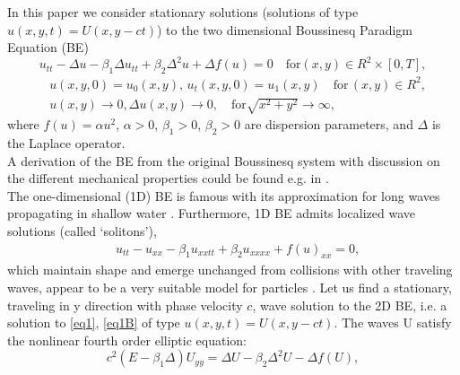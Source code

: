 \documentclass[12pt]{article}
\theoremstyle{theorem}
\theoremstyle{defi}
\begin{document}
In this paper we consider stationary solutions (solutions of type  $u(x,y,t)=U(x,y - ct)$) to the two dimensional Boussinesq Paradigm Equation (BE) 
\begin{equation}
u_{tt} - \Delta u -\beta_1  \Delta u_{tt} +\beta_2 \Delta ^2 u + \Delta f(u)=0 \quad \text{for} (x,y) \in R^2 \times [0,T] ,\label{eq1}
\end{equation}
\begin{equation}\label{eq1B}
\begin{split}
&u(x,y,0)=u_0(x,y), \, u_t(x,y,0)=u_1(x,y)   \quad\text{for} \, (x,y) \in R^2, \\
&u(x,y) \rightarrow 0,  \Delta u(x,y) \rightarrow 0 ,  \quad \text{for}  \sqrt{x^2 + y^2} \rightarrow \infty, 
\end{split}
\end{equation}
where   $f(u)=\alpha u^2$,  $\alpha>0$, $\beta_1>0$, $\beta_2>0$  are dispersion parameters, and $\Delta$ is the Laplace operator. 
\\
A derivation of the BE from the original Boussinesq system with discussion on the different mechanical properties could be found e.g. in \cite{ref1}. 
\\
The one-dimensional (1D) BE is famous with its approximation for long waves propagating in shallow water \cite{ref2, ref3}. Furthermore, 1D BE admits localized wave solutions (called ‘solitons’), 
\begin{align}
&u_{tt} - u_{xx} -\beta_1  u_{xxtt} +\beta_2 u_{xxxx} + f(u)_{xx} =0, \label{eq2}
\end{align}
which maintain shape and emerge unchanged from collisions with other traveling waves, appear to be a very suitable model for particles \cite{ref4, ref5}.
Let us find a stationary, traveling in y direction with phase velocity $c$, wave solution to the 2D BE, i.e. a solution to \eqref{eq1}, \eqref{eq1B} of type $u(x,y,t)=U(x,y - ct)$. The waves U satisfy the nonlinear fourth order elliptic equation:
\begin{equation}
c^2 (E-\beta_1 \Delta) U_{yy} = \Delta U -\beta_2 \Delta^2 U - \Delta f(U), \label{eq3}
\end{equation}
\end{document}
